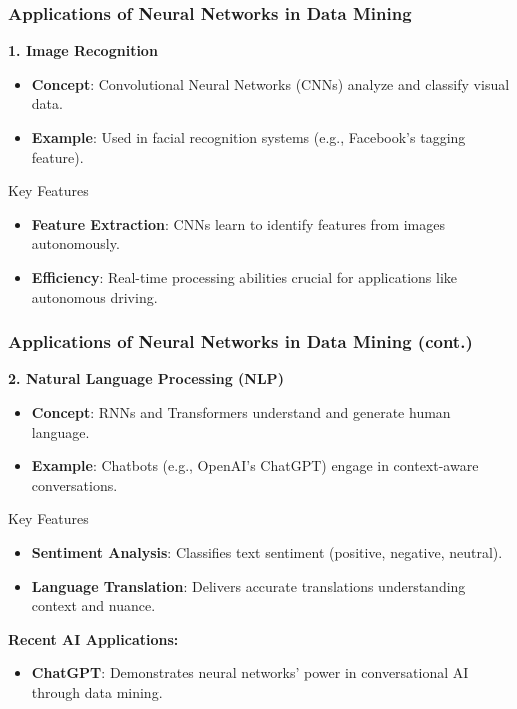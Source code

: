 \documentclass[aspectratio=169]{beamer}
\begin{document}
\begin{frame}[fragile]
    \frametitle{Applications of Neural Networks in Data Mining}

    \textbf{1. Image Recognition}
    \begin{itemize}
        \item \textbf{Concept}: Convolutional Neural Networks (CNNs) analyze and classify visual data.
        \item \textbf{Example}: Used in facial recognition systems (e.g., Facebook's tagging feature).
    \end{itemize}

    \begin{block}{Key Features}
        \begin{itemize}
            \item \textbf{Feature Extraction}: CNNs learn to identify features from images autonomously.
            \item \textbf{Efficiency}: Real-time processing abilities crucial for applications like autonomous driving.
        \end{itemize}
    \end{block}

\end{frame}

\begin{frame}[fragile]
    \frametitle{Applications of Neural Networks in Data Mining (cont.)}

    \textbf{2. Natural Language Processing (NLP)}
    \begin{itemize}
        \item \textbf{Concept}: RNNs and Transformers understand and generate human language.
        \item \textbf{Example}: Chatbots (e.g., OpenAI's ChatGPT) engage in context-aware conversations.
    \end{itemize}

    \begin{block}{Key Features}
        \begin{itemize}
            \item \textbf{Sentiment Analysis}: Classifies text sentiment (positive, negative, neutral).
            \item \textbf{Language Translation}: Delivers accurate translations understanding context and nuance.
        \end{itemize}
    \end{block}

    \textbf{Recent AI Applications:}
    \begin{itemize}
        \item \textbf{ChatGPT}: Demonstrates neural networks' power in conversational AI through data mining.
    \end{itemize}
\end{frame}
\end{document}
